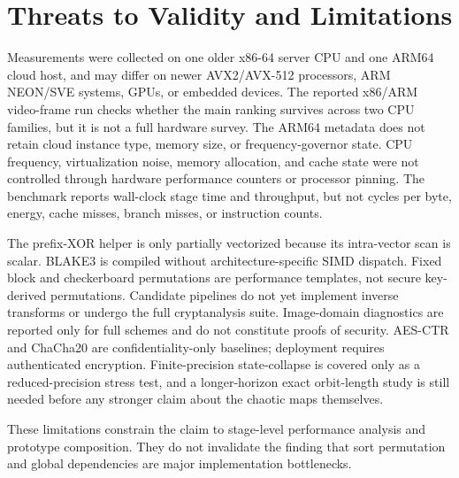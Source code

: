 \documentclass[twocolumn,runningheads]{svjour3}
\begin{document}
\section{Threats to Validity and Limitations}
\label{sec:limitations}
Measurements were collected on one older x86-64 server CPU and one ARM64 cloud
host, and may differ on newer AVX2/AVX-512 processors, ARM NEON/SVE systems,
GPUs, or embedded devices. The reported x86/ARM video-frame run checks whether
the main ranking survives across two CPU families, but it is not a full
hardware survey. The ARM64 metadata does not retain cloud instance type, memory
size, or frequency-governor state. CPU frequency, virtualization noise, memory
allocation, and cache state were not controlled through hardware performance
counters or processor pinning. The benchmark reports wall-clock stage time and
throughput, but not cycles per byte, energy, cache misses, branch misses, or
instruction counts.

The prefix-XOR helper is only partially vectorized because its intra-vector
scan is scalar. BLAKE3 is compiled without architecture-specific SIMD
dispatch. Fixed block and checkerboard permutations are performance templates,
not secure key-derived permutations. Candidate pipelines do not yet implement
inverse transforms or undergo the full cryptanalysis suite. Image-domain
diagnostics are reported only for full schemes and do not constitute proofs of
security. AES-CTR and ChaCha20 are confidentiality-only baselines; deployment
requires authenticated encryption. Finite-precision state-collapse is covered
only as a reduced-precision stress test, and a longer-horizon exact
orbit-length study is still needed before any stronger claim about the chaotic
maps themselves.

These limitations constrain the claim to stage-level performance analysis and
prototype composition. They do not invalidate the finding that sort
permutation and global dependencies are major implementation bottlenecks.
\end{document}

